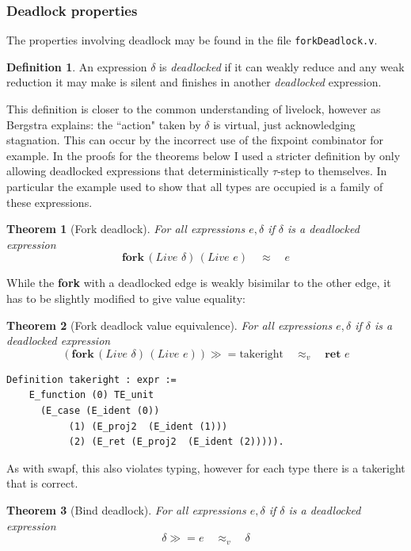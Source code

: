 \documentclass[12pt,twoside,notitlepage]{report}
\theoremstyle{plain}%
\newtheorem{thm}{Theorem}[section]
\theoremstyle{definition}
\newtheorem{defn}{Definition}[section]
\theoremstyle{remark}
\begin{document}
\subsubsection{Deadlock properties}
The properties involving deadlock may be found in the file \verb|forkDeadlock.v|.

\begin{defn}
An expression $ \delta $ is \textit{deadlocked} if it can weakly reduce and any weak reduction it may make is silent and finishes in another \textit{deadlocked} expression. 
\end{defn}

This definition is closer to the common understanding of livelock, however as Bergstra\cite{bergstra1984process} explains: the ``action" taken by $ \delta $ is virtual, just acknowledging stagnation. This can occur by the incorrect use of the fixpoint combinator for example. In the proofs for the theorems below I used a stricter definition by only allowing deadlocked expressions that deterministically $ \tau $-step to themselves. In particular the example used to show that all types are occupied is a family of these expressions.
\begin{thm}[Fork deadlock]
For all expressions $ e, \delta$ if $ \delta $ is a deadlocked expression
\[  \textbf{fork}\,(\textit{Live }\delta)\,(\textit{Live }e)\quad \approx \quad e \]
\end{thm}

While the \textbf{fork} with a deadlocked edge is weakly bisimilar to the other edge, it has to be slightly modified to give value equality:

\begin{thm}[Fork deadlock value equivalence]
For all expressions $ e, \delta$ if $ \delta $ is a deadlocked expression
\[  (\textbf{fork}\,(\textit{Live }\delta)\,(\textit{Live }e))\gg=\text{takeright}\quad \approx_v \quad \textbf{ret }e \]
\end{thm}

\begin{lstlisting}[language={Coq}, caption={takeright operator}, label={lst:takeright_op}]
Definition takeright : expr :=
    E_function (0) TE_unit 
      (E_case (E_ident (0)) 
           (1) (E_proj2  (E_ident (1))) 
           (2) (E_ret (E_proj2  (E_ident (2))))).
\end{lstlisting}

As with swapf, this also violates typing, however for each type there is a takeright that is correct.

\begin{thm}[Bind deadlock]
For all expressions $ e, \delta$ if $ \delta $ is a deadlocked expression
\[  \delta \gg= e\quad \approx_v \quad \delta \]
\end{thm}
\end{document}
